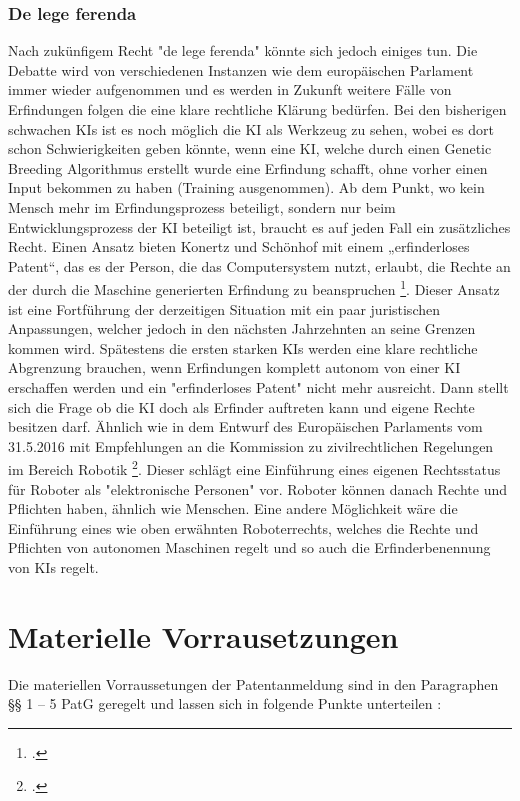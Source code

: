 \subsubsection{De lege ferenda}
Nach zukünfigem Recht "de lege ferenda" könnte sich jedoch einiges tun.
Die Debatte wird von verschiedenen 
Instanzen wie dem europäischen Parlament immer wieder aufgenommen und es 
werden in Zukunft weitere Fälle von Erfindungen folgen die eine klare rechtliche 
Klärung bedürfen. 
Bei den bisherigen schwachen KIs ist es noch möglich die KI als Werkzeug
zu sehen, wobei es dort schon Schwierigkeiten geben könnte, wenn eine KI,
welche durch einen Genetic Breeding Algorithmus erstellt wurde eine Erfindung
schafft, ohne vorher einen Input bekommen zu haben (Training ausgenommen).
Ab dem Punkt, wo kein Mensch mehr im Erfindungsprozess beteiligt,
sondern nur beim Entwicklungsprozess der KI beteiligt ist,
braucht es auf jeden Fall ein zusätzliches Recht.
Einen Ansatz bieten Konertz und Schönhof mit einem 
„erfinderloses Patent“, das es der Person, 
die das Computersystem nutzt, erlaubt, 
die Rechte an der durch die Maschine generierten Erfindung zu beanspruchen
\footcite{konertzErfindungenDurchComputer2018}. 
Dieser Ansatz ist eine Fortführung der derzeitigen Situation mit ein paar
juristischen Anpassungen, welcher jedoch in den nächsten Jahrzehnten 
an seine Grenzen kommen wird.
Spätestens die ersten starken KIs werden eine klare rechtliche Abgrenzung 
brauchen, 
wenn Erfindungen komplett autonom 
von einer KI erschaffen werden und ein "erfinderloses Patent" 
nicht mehr ausreicht.
Dann stellt sich die Frage ob die KI doch als Erfinder auftreten kann 
und eigene Rechte besitzen darf. Ähnlich wie in dem Entwurf des Europäischen
Parlaments vom 31.5.2016 mit
Empfehlungen an die Kommission zu zivilrechtlichen Regelungen im
Bereich Robotik \footcite{delvauxMitEmpfehlungenKommission}. 
Dieser schlägt 
eine Einführung eines eigenen Rechtsstatus 
für Roboter als "elektronische Personen" vor.
Roboter können danach Rechte und Pflichten haben, 
ähnlich wie Menschen.
Eine andere Möglichkeit wäre die Einführung eines wie oben 
erwähnten Roboterrechts, welches die Rechte und Pflichten von
autonomen Maschinen regelt und so auch die Erfinderbenennung
von KIs regelt.
\\

\section{Materielle Vorrausetzungen}

Die materiellen Vorraussetungen der Patentanmeldung sind 
in den Paragraphen §§ 1 – 5 PatG geregelt 
und lassen sich in folgende Punkte unterteilen :

